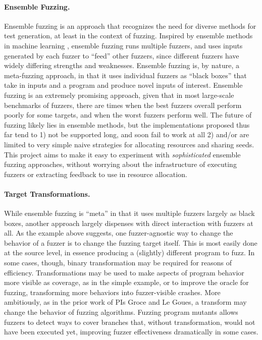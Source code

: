 \documentclass[numbers]{proposalnsf}
\begin{document}
\paragraph{Ensemble Fuzzing.}   Ensemble fuzzing \cite{chen2019enfuzz} is an approach that recognizes the need for
diverse methods for test generation, at least in the context of
fuzzing.   Inspired by ensemble methods in machine learning \cite{dietterich2002ensemble},
ensemble fuzzing runs multiple fuzzers, and uses inputs generated by
each fuzzer to ``feed'' other fuzzers, since different fuzzers have widely differing strengths and weaknesses. Ensemble fuzzing is, by nature, a meta-fuzzing approach, in that it uses individual fuzzers as ``black boxes'' that take in inputs and a program and produce novel inputs of interest.  Ensemble fuzzing is an extremely promising approach, given that in most large-scale benchmarks of fuzzers, there are times when the best fuzzers overall perform poorly for some targets, and when the worst fuzzers perform well.  The future of fuzzing likely lies in ensemble methods, but the implementations proposed thus far tend to 1) not be supported long, and soon fail to work at all 2) and/or are limited to very simple naive strategies for allocating resources and sharing seeds.  This project aims to make it easy to experiment with \emph{sophisticated} ensemble fuzzing approaches, without worrying about the infrastructure of executing fuzzers or extracting feedback to use in resource allocation.

\paragraph{Target Transformations.}  While ensemble fuzzing is ``meta'' in that it uses multiple fuzzers largely as black boxes, another approach largely dispenses with direct interaction with fuzzers at all.  As the example above suggests, one fuzzer-agnostic way to change the behavior of a fuzzer is to change the fuzzing target itself.  This is most easily done at the source level, in essence producing a (slightly) different program to fuzz.  In some cases, though, binary transformation may be required for reasons of efficiency.  Transformations may be used to make aspects of program behavior more visible as coverage, as in the simple example, or to improve the oracle for fuzzing, transforming more behaviors into fuzzer-visible crashes.  More ambitiously, as in the prior work of PIs Groce and Le Goues, a transform may change the behavior of fuzzing algorithms.  Fuzzing program mutants allows fuzzers to detect ways to cover branches that, without transformation, would not have been executed yet, improving fuzzer effectiveness dramatically in some cases.
\end{document}
